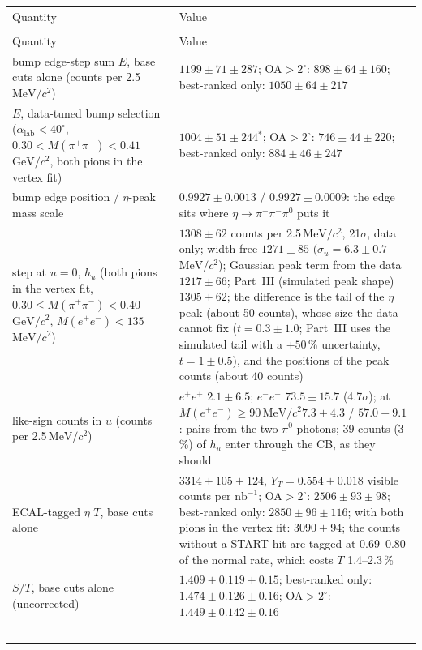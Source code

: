\documentclass[11pt,a4paper]{article}
\newcommand{\piz}{\ensuremath{\pi^{0}}\xspace}
\newcommand{\pipi}{\ensuremath{\pi^{+}\pi^{-}}\xspace}
\newcommand{\Mee}{\ensuremath{M(e^{+}e^{-})}\xspace}
\newcommand{\Mpipi}{\ensuremath{M(\pi^{+}\pi^{-})}\xspace}
\newcommand{\nbinv}{\ensuremath{\mathrm{nb}^{-1}}\xspace}
\newcommand{\GeVcc}{\ensuremath{\mathrm{GeV}/c^{2}}\xspace}
\newcommand{\MeVcc}{\ensuremath{\mathrm{MeV}/c^{2}}\xspace}
\newcommand{\alab}{\ensuremath{\alpha_{\mathrm{lab}}}\xspace}
\begin{document}
\vspace{0.4em}
{\footnotesize\setlength{\tabcolsep}{3pt}\setlength{\LTpre}{0pt}\setlength{\LTpost}{0pt}
\begin{longtable}{@{}>{\raggedright\arraybackslash}p{5.4cm} >{\raggedright\arraybackslash}p{\dimexpr\textwidth-5.4cm-2\tabcolsep\relax}@{}}
\multicolumn{2}{c}{(b)} \\
\toprule
Quantity & Value \\
\midrule
\endfirsthead
\multicolumn{2}{@{}l}{\emph{Table~\ref{tab:main}(b), continued}} \\
\toprule
Quantity & Value \\
\midrule
\endhead
bump edge-step sum $E$, base cuts alone (counts per 2.5\,\MeVcc) & $1199\pm71\pm287$; OA$>2^\circ$: $898\pm64\pm160$; best-ranked only: $1050\pm64\pm217$ \\
$E$, data-tuned bump selection ($\alab<40^\circ$, $0.30<\Mpipi<0.41$\,\GeVcc, both pions in the vertex fit) & $1004\pm51\pm244$$^{\ast}$; OA$>2^\circ$: $746\pm44\pm220$; best-ranked only: $884\pm46\pm247$ \\
bump edge position / $\eta$-peak mass scale & $0.9927\pm0.0013$ / $0.9927\pm0.0009$: the edge sits where $\eta\to\pipi\piz$ puts it \\
step at $u=0$, $h_u$ (both pions in the vertex fit, $0.30\le\Mpipi<0.40$\,\GeVcc, $\Mee<135$\,\MeVcc) & $1308\pm62$ counts per 2.5\,\MeVcc,
   21$\sigma$, data only; width free $1271\pm85$ ($\sigma_u=6.3\pm0.7$\,\MeVcc); Gaussian peak term from the data $1217\pm66$; Part~III
   (simulated peak shape) $1305\pm62$; the difference is the tail of the $\eta$ peak (about 50 counts), whose size the data cannot fix
   ($t=0.3\pm1.0$; Part~III uses the simulated tail with a $\pm50$\,\% uncertainty, $t=1\pm0.5$), and the positions of the peak counts
   (about 40 counts) \\
like-sign counts in $u$ (counts per 2.5\,\MeVcc) & $e^+e^+$ $2.1\pm6.5$; $e^-e^-$ $73.5\pm15.7$ (4.7$\sigma$); at $\Mee\ge90$\,\MeVcc $7.3\pm4.3$ / $57.0\pm9.1$:
   pairs from the two \piz photons; 39 counts (3\,\%) of $h_u$ enter through the CB, as they should \\
ECAL-tagged $\eta$ $T$, base cuts alone & $3314\pm105\pm124$, $Y_T=0.554\pm0.018$ visible counts per \nbinv; OA$>2^\circ$: $2506\pm93\pm98$;
   best-ranked only: $2850\pm96\pm116$; with both pions in the vertex fit: $3090\pm94$; the counts without a START hit are tagged at
   0.69--0.80 of the normal rate, which costs $T$ 1.4--2.3\,\% \\
$S/T$, base cuts alone (uncorrected) & $1.409\pm0.119\pm0.15$; best-ranked only: $1.474\pm0.126\pm0.16$; OA$>2^\circ$: $1.449\pm0.142\pm0.16$ \\
$$
\end{longtable}}
\end{document}
